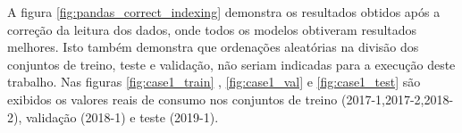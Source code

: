                     A figura \ref{fig:pandas_correct_indexing} demonstra os resultados obtidos após a correção da leitura dos dados, onde todos os modelos obtiveram resultados melhores. 
                    Isto também demonstra que ordenações aleatórias na divisão dos conjuntos de treino, teste e validação, não seriam indicadas para a execução deste trabalho.
                    Nas figuras \ref{fig:case1_train} , \ref{fig:case1_val} e \ref{fig:case1_test}   são exibidos os valores reais de consumo nos conjuntos de treino (2017-1,2017-2,2018-2), validação (2018-1) e teste (2019-1).
                    {  \begin{center}
                    \begin{minipage}[c]{0.45\textwidth}
                        \begin{figure}[H]
                        \end{figure}
                        \end{minipage} \hfill %
                          \begin{minipage}[c]{0.45\textwidth}
                        \begin{figure}[H]

\end{figure}
\end{minipage}
\end{center}}
